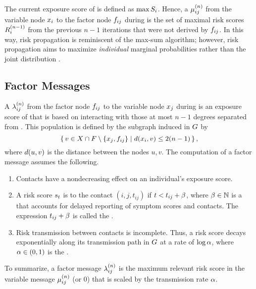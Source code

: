 The current exposure score of  is defined as $\max S_i$. Hence, a  $\mu_{ij}^{(n)}$ from the variable node $\vVariable[i]$ to the factor node $\vFactor[ij]$ during  is the set of maximal risk scores $R_{i}^{(n - 1)}$ from the previous $n - 1$ iterations that were not derived by $\vFactor[ij]$. In this way, risk propagation is reminiscent of the max-sum algorithm; however, risk propagation aims to maximize \emph{individual} marginal probabilities rather than the joint distribution \cite[pp. 411--415]{Bishop2006}.

\subsection{Factor Messages}

A  $\lambda_{ij}^{(n)}$ from the factor node $\vFactor[ij]$ to the variable node $\vVariable[j]$ during  is an exposure score of  that is based on interacting with those at most $n - 1$ degrees separated from . This population is defined by the subgraph induced in $G$ by
%
\begin{equation*}
  \setBuilder{v \in \vVariables \cap \vFactors \setminus \{\vVariable[j], \vFactor[ij]\}}{\dist(\vVariable[i], v) \leq 2(n - 1)},
\end{equation*}
%
where $d(u, v)$ is the distance between the nodes $u, v$. The computation of a factor message assumes the following.
%
\begin{enumerate}
  \item Contacts have a nondecreasing effect on an individual's exposure score.
  \item A risk score $s_t$ is  to the contact $(i, j, t_{ij})$ if $t < t_{ij} +\beta$, where $\beta \in \mathbb{N}$ is a  that accounts for delayed reporting of symptom scores and contacts. The expression $t_{ij} +\beta$ is called the .
  \item Risk transmission between contacts is incomplete. Thus, a risk score decays exponentially along its transmission path in $G$ at a rate of $\log \alpha$, where $\alpha \in (0, 1)$ is the .
\end{enumerate}
%
To summarize, a factor message $\lambda_{ij}^{(n)}$ is the maximum relevant risk score in the variable message $\mu_{ij}^{(n)}$ (or 0) that is scaled by the transmission rate $\alpha$.

